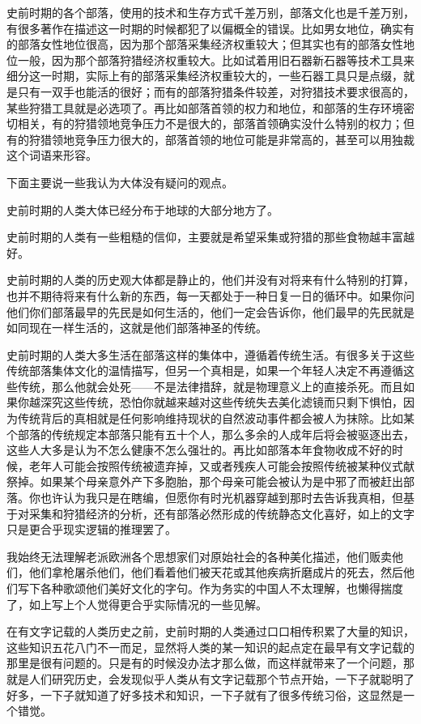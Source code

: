 \documentclass[12pt,oneside]{book}
\begin{document}
史前时期的各个部落，使用的技术和生存方式千差万别，部落文化也是千差万别，有很多著作在描述这一时期的时候都犯了以偏概全的错误。比如男女地位，确实有的部落女性地位很高，因为那个部落采集经济权重较大；但其实也有的部落女性地位一般，因为那个部落狩猎经济权重较大。比如试着用旧石器新石器等技术工具来细分这一时期，实际上有的部落采集经济权重较大的，一些石器工具只是点缀，就是只有一双手也能活的很好；而有的部落狩猎条件较差，对狩猎技术要求很高的，某些狩猎工具就是必选项了。再比如部落首领的权力和地位，和部落的生存环境密切相关，有的狩猎领地竞争压力不是很大的，部落首领确实没什么特别的权力；但有的狩猎领地竞争压力很大的，部落首领的地位可能是非常高的，甚至可以用独裁这个词语来形容。

下面主要说一些我认为大体没有疑问的观点。

史前时期的人类大体已经分布于地球的大部分地方了。

史前时期的人类有一些粗糙的信仰，主要就是希望采集或狩猎的那些食物越丰富越好。

史前时期的人类的历史观大体都是静止的，他们并没有对将来有什么特别的打算，也并不期待将来有什么新的东西，每一天都处于一种日复一日的循环中。如果你问他们你们部落最早的先民是如何生活的，他们一定会告诉你，他们最早的先民就是如同现在一样生活的，这就是他们部落神圣的传统。

史前时期的人类大多生活在部落这样的集体中，遵循着传统生活。有很多关于这些传统部落集体文化的温情描写，但另一个真相是，如果一个年轻人决定不再遵循这些传统，那么他就会处死——不是法律措辞，就是物理意义上的直接杀死。而且如果你越深究这些传统，恐怕你就越来越对这些传统失去美化滤镜而只剩下惧怕，因为传统背后的真相就是任何影响维持现状的自然波动事件都会被人为抹除。比如某个部落的传统规定本部落只能有五十个人，那么多余的人成年后将会被驱逐出去，这些人大多是认为不怎么健康不怎么强壮的。再比如部落本年食物收成不好的时候，老年人可能会按照传统被遗弃掉，又或者残疾人可能会按照传统被某种仪式献祭掉。如果某个母亲意外产下多胞胎，那个母亲可能会被认为是中邪了而被赶出部落。你也许认为我只是在瞎编，但愿你有时光机器穿越到那时去告诉我真相，但基于对采集和狩猎经济的分析，还有部落必然形成的传统静态文化喜好，如上的文字只是更合乎现实逻辑的推理罢了。

我始终无法理解老派欧洲各个思想家们对原始社会的各种美化描述，他们贩卖他们，他们拿枪屠杀他们，他们看着他们被天花或其他疾病折磨成片的死去，然后他们写下各种歌颂他们美好文化的字句。作为务实的中国人不太理解，也懒得揣度了，如上写上个人觉得更合乎实际情况的一些见解。

在有文字记载的人类历史之前，史前时期的人类通过口口相传积累了大量的知识，这些知识五花八门不一而足，显然将人类的某一知识的起点定在最早有文字记载的那里是很有问题的。只是有的时候没办法才那么做，而这样就带来了一个问题，那就是人们研究历史，会发现似乎人类从有文字记载那个节点开始，一下子就聪明了好多，一下子就知道了好多技术和知识，一下子就有了很多传统习俗，这显然是一个错觉。
\end{document}
